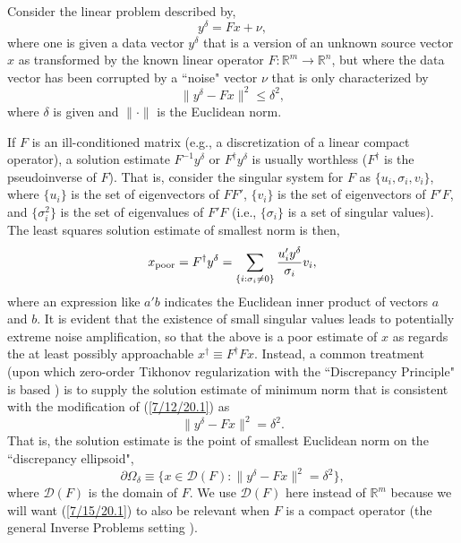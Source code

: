 \documentclass{amsart}
\numberwithin{equation}{section}
\theoremstyle{definition}
\numberwithin{theorem}{section}
\begin{document}
    
 Consider the linear problem described by, \begin{equation}\label{7/7/20.9}  y^\delta=Fx + \nu,\end{equation} where one is given a data vector $y^\delta$ that is a version of an unknown source vector $x$ as transformed by the known linear operator $F:\mathbb{R}^m\rightarrow\mathbb{R}^n$, but where the data vector has been corrupted by a ``noise" vector $\nu$ that is only characterized by   \begin{equation}\label{7/12/20.1} \| y^\delta - Fx\|^2 \le \delta^2, \end{equation}  where $\delta$ is given and $\|\cdot \|$ is the Euclidean norm.  
    
If $F$ is an ill-conditioned matrix (e.g., a discretization of a linear compact operator), a solution estimate $F^{-1}y^\delta$ or $F^\dagger y^\delta$ is usually worthless ($F^\dagger$ is the pseudoinverse of $F$).  That is, consider the singular system for $F$ as  $\{u_i ,\sigma_i, v_i\}$, where $\{u_i\}$ is the set of eigenvectors of $FF'$, $\{v_i\}$ is the set of eigenvectors of $F'F$, and $\{\sigma_i^2 \}$ is the set of eigenvalues of $F'F$ (i.e., $\{\sigma_i \}$ is a set of singular values).   The least squares solution estimate of smallest norm is then, \begin{equation}\label{7/7/20.8} x_{\rm poor} = F^\dagger y^\delta = \sum_{ \{i: \sigma_i \ne 0\}} \frac{u_i' y^\delta}{\sigma_i}v_i,\end{equation} where  an expression like $a' b$ indicates the Euclidean inner product of vectors $a$ and $b$.   It is evident that the existence of small singular values  leads to potentially extreme noise amplification, so that the above is a poor estimate of $x$ as regards the at least possibly approachable $x^\dagger \equiv F^\dagger F x$.
 Instead, a common treatment (upon which zero-order Tikhonov regularization with the ``Discrepancy Principle" is based \cite{vogel:2002,engl:2000}) is to supply the solution estimate of minimum norm that is consistent with the modification of (\ref{7/12/20.1}) as \begin{equation}\label{7/7/20.3} \| y^\delta - Fx\|^2 =\delta^2 .\end{equation}   That is, the solution estimate is the point of smallest Euclidean norm on the ``discrepancy ellipsoid",   \begin{equation}\label{7/15/20.1} \partial\Omega_\delta \equiv \{ x\in \mathcal{D}(F): \| y^\delta - Fx\|^2 =\delta^2\},\end{equation} where $\mathcal{D}(F)$ is the domain of $F$.  We use $\mathcal{D}(F)$ here instead of $\mathbb{R}^m$ because we will want (\ref{7/15/20.1}) to also be relevant when $F$ is a compact operator (the general Inverse Problems setting \cite{engl:2000}).
\end{document}
